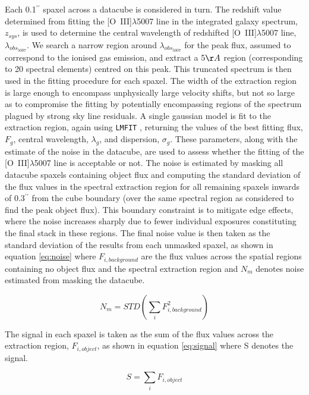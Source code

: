 \documentclass[fleqn,usenatbib]{mn2e}
\begin{document}
Each 0.1$^{\prime\prime}$ spaxel across a datacube is considered in turn.
The redshift value determined from fitting the [O~{\sc III}]$\lambda$5007 line in the integrated galaxy spectrum, $z_{sys}$, is used to determine the central wavelength of redshifted [O~{\sc III}]$\lambda$5007 line, $\lambda_{obs_{5007}}$. 
We search a narrow region around $\lambda_{obs_{5007}}$ for the peak flux, assumed to correspond to the ionised gas emission, and extract a 5$\AA$ region (corresponding to 20 spectral elements) centred on this peak.
This truncated spectrum is then used in the fitting procedure for each spaxel.
The width of the extraction region is large enough to encompass unphysically large velocity shifts, but not so large as to compromise the fitting by potentially encompassing regions of the spectrum plagued by strong sky line residuals.
A single gaussian model is fit to the extraction region, again using {\tt LMFIT} \citep{Newville2014}, returning the values of the best fitting flux, $F_{g}$, central wavelength, $\lambda_{g}$, and dispersion, $\sigma_{g}$.
These parameters, along with the estimate of the noise in the datacube, are used to assess whether the fitting of the [O~{\sc III}]$\lambda$5007 line is acceptable or not. 
The noise is estimated by masking all datacube spaxels containing object flux and computing the standard deviation of the flux values in the spectral extraction region for all remaining spaxels inwards of 0.3$^{\prime\prime}$ from the cube boundary (over the same spectral region as considered to find the peak object flux).
This boundary constraint is to mitigate edge effects, where the noise increases sharply due to fewer individual exposures constituting the final stack in these regions.
The final noise value is then taken as the standard deviation of the results from each unmasked spaxel, as shown in equation \ref{eq:noise} where $F_{i,background}$ are the flux values across the spatial regions containing no object flux and the spectral extraction region and $N_{m}$ denotes noise estimated from masking the datacube.

\begin{equation}\label{eq:noise}
    N_{m} = STD\left(\sum_{i}F_{i,background}^{2}\right)
\end{equation}

The signal in each spaxel is taken as the sum of the flux values across the extraction region, $F_{i,object}$, as shown in equation \ref{eq:signal} where S denotes the signal.

\begin{equation}\label{eq:signal}
    S = \sum_{i}F_{i,object}
\end{equation}
\end{document}
